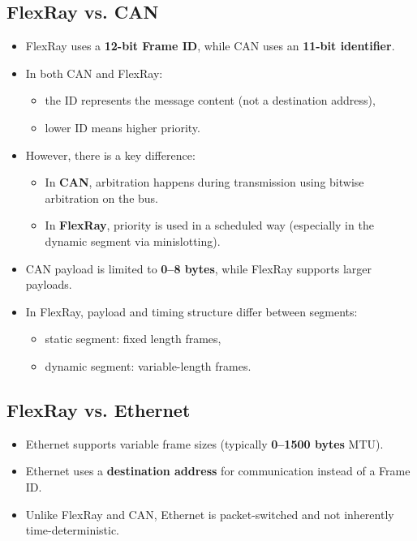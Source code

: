 \subsection*{FlexRay vs. CAN}

\begin{itemize}
    \item FlexRay uses a \textbf{12-bit Frame ID}, while CAN uses an \textbf{11-bit identifier}.
    
    \item In both CAN and FlexRay:
    \begin{itemize}
        \item the ID represents the message content (not a destination address),
        \item lower ID means higher priority.
    \end{itemize}
    
    \item However, there is a key difference:
    \begin{itemize}
        \item In \textbf{CAN}, arbitration happens during transmission using bitwise arbitration on the bus.
        \item In \textbf{FlexRay}, priority is used in a scheduled way (especially in the dynamic segment via minislotting).
    \end{itemize}
    
    \item CAN payload is limited to \textbf{0--8 bytes}, while FlexRay supports larger payloads.
    
    \item In FlexRay, payload and timing structure differ between segments:
    \begin{itemize}
        \item static segment: fixed length frames,
        \item dynamic segment: variable-length frames.
    \end{itemize}
\end{itemize}

\subsection*{FlexRay vs. Ethernet}

\begin{itemize}
    \item Ethernet supports variable frame sizes (typically \textbf{0--1500 bytes} MTU).
    
    \item Ethernet uses a \textbf{destination address} for communication instead of a Frame ID.
    
    \item Unlike FlexRay and CAN, Ethernet is packet-switched and not inherently time-deterministic.
\end{itemize}



